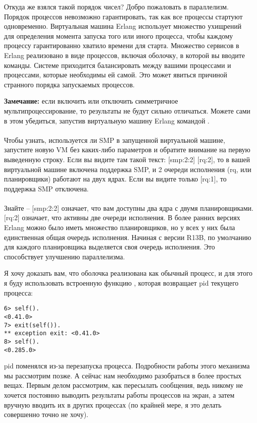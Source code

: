 Откуда же взялся такой порядок чисел?
Добро пожаловать в параллелизм.
Порядок процессов невозможно гарантировать, так как все процессы стартуют одновременно.
Виртуальная машина Erlang использует множество ухищрений для определения момента запуска того или иного процесса, чтобы каждому процессу гарантированно хватило времени для старта.
Множество сервисов в Erlang реализовано в виде процессов, включая оболочку, в которой вы вводите команды.
Системе приходится балансировать между вашими процессами и процессами, которые необходимы ей самой.
Это может явиться причиной странного порядка запускаемых процессов.\\
\colorbox{lgray}
{
\begin{minipage}{1.0\linewidth}
    \textbf{Замечание:} если включить или отключить симметричное мультипроцессирование, то результаты не будут сильно отличаться.
    Можете сами в этом убедиться, запустив виртуальную машину Erlang командой .\\
    \\
    Чтобы узнать, используется ли SMP в запущенной виртуальной машине, запустите новую VM без каких\--либо параметров и обратите внимание на первую выведенную строку.
    Если вы видите там такой текст: [smp:2:2] [rq:2], то в вашей виртуальной машине включена поддержка SMP, и 2 очереди исполнения (rq, или планировщики) работают на двух ядрах.
    Если вы видите только [rq:1], то поддержка SMP отключена.\\
    \\
    Знайте \--- [smp:2:2] означает, что вам доступны два ядра с двумя планировщиками.
    [rq:2] означает, что активны две очереди исполнения.
    В более ранних версиях Erlang можно было иметь множество планировщиков, но у всех у них была единственная общая очередь исполнения.
    Начиная с версии R13B, по умолчанию для каждого планировщика выделяется своя очередь исполнения.
    Это способствует улучшению параллелизма.
\end{minipage}
}

Я хочу доказать вам, что оболочка реализована как обычный процесс, и для этого я буду использовать встроенную функцию , которая возвращает pid текущего процесса:
\begin{lstlisting}[style=erlang]
6> self().
<0.41.0>
7> exit(self()).
** exception exit: <0.41.0>
8> self().
<0.285.0>
\end{lstlisting}
pid поменялся из\--за перезапуска процесса.
Подробности работы этого механизма мы рассмотрим позже.
А сейчас нам необходимо разобраться в более простых вещах.
Первым делом рассмотрим, как пересылать сообщения, ведь никому не хочется постоянно выводить результаты работы процессов на экран, а затем вручную вводить их в других процессах (по крайней мере, я это делать совершенно точно не хочу).

